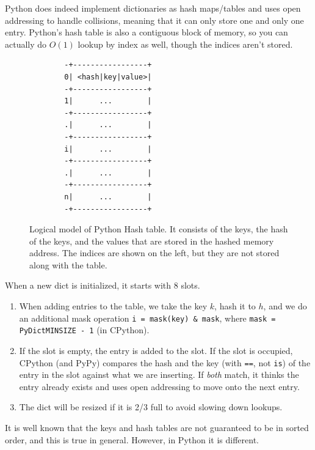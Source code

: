   \begin{definition}
    \label{def:python-dictionaries}
    Python does indeed implement dictionaries as hash maps/tables and uses open addressing to handle collisions, meaning that it can only store one and only one entry. Python's hash table is also a contiguous block of memory, so you can actually do $O(1)$ lookup by index as well, though the indices aren't stored. 

    \begin{figure}[H]
      \centering 
      \begin{lstlisting}
        -+-----------------+
        0| <hash|key|value>|
        -+-----------------+
        1|      ...        |
        -+-----------------+
        .|      ...        |
        -+-----------------+
        i|      ...        |
        -+-----------------+
        .|      ...        |
        -+-----------------+
        n|      ...        |
        -+-----------------+ 
      \end{lstlisting}
      \caption{Logical model of Python Hash table. It consists of the keys, the hash of the keys, and the values that are stored in the hashed memory address. The indices are shown on the left, but they are not stored along with the table. }
      \label{fig:hash_table}
    \end{figure}

    When a new dict is initialized, it starts with 8 slots. 
    \begin{enumerate}
      \item When adding entries to the table, we take the key $k$, hash it to $h$, and we do an additional mask operation \texttt{i = mask(key) \& mask}, where \texttt{mask = PyDictMINSIZE - 1} (in CPython). 
      \item If the slot is empty, the entry is added to the slot. If the slot is occupied, CPython (and PyPy) compares the hash and the key (with \texttt{==}, not \texttt{is}) of the entry in the slot against what we are inserting. If \textit{both} match, it thinks the entry already exists and uses open addressing to move onto the next entry. 
      \item The dict will be resized if it is 2/3 full to avoid slowing down lookups. 
    \end{enumerate}
  \end{definition}

  It is well known that the keys and hash tables are not guaranteed to be in sorted order, and this is true in general. However, in Python it is different. 

